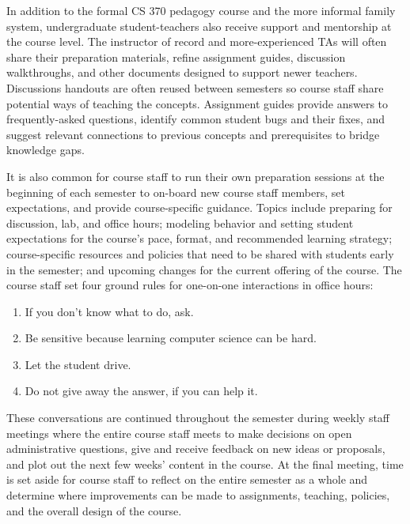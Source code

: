 In addition to the formal CS 370 pedagogy course and the more informal family system, undergraduate student-teachers also receive support and mentorship at the course level. The instructor of record and more-experienced TAs will often share their preparation materials, refine assignment guides, discussion walkthroughs, and other documents designed to support newer teachers. Discussions handouts are often reused between semesters so course staff share potential ways of teaching the concepts. Assignment guides provide answers to frequently-asked questions, identify common student bugs and their fixes, and suggest relevant connections to previous concepts and prerequisites to bridge knowledge gaps.

It is also common for course staff to run their own preparation sessions at the beginning of each semester to on-board new course staff members, set expectations, and provide course-specific guidance. Topics include preparing for discussion, lab, and office hours; modeling behavior and setting student expectations for the course's pace, format, and recommended learning strategy; course-specific resources and policies that need to be shared with students early in the semester; and upcoming changes for the current offering of the course. The course staff set four ground rules for one-on-one interactions in office hours:
\begin{enumerate}
    \item If you don't know what to do, ask.
    \item Be sensitive because learning computer science can be hard.
    \item Let the student drive.
    \item Do not give away the answer, if you can help it.
\end{enumerate}
These conversations are continued throughout the semester during weekly staff meetings where the entire course staff meets to make decisions on open administrative questions, give and receive feedback on new ideas or proposals, and plot out the next few weeks' content in the course. At the final meeting, time is set aside for course staff to reflect on the entire semester as a whole and determine where improvements can be made to assignments, teaching, policies, and the overall design of the course.

